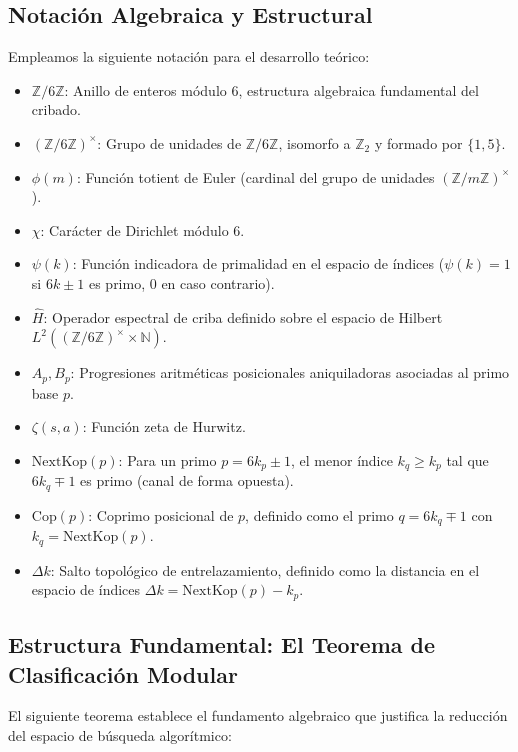 \documentclass{article}
\numberwithin{equation}{section}
\newcommand{\ZZ}{\mathbb{Z}}
\newcommand{\NN}{\mathbb{N}}
\theoremstyle{plain}
\theoremstyle{definition}
\begin{document}
\subsection{Notación Algebraica y Estructural}

Empleamos la siguiente notación para el desarrollo teórico:
\begin{itemize}
    \item $\ZZ/6\ZZ$: Anillo de enteros módulo 6, estructura algebraica fundamental del cribado.
    \item $(\ZZ/6\ZZ)^\times$: Grupo de unidades de $\ZZ/6\ZZ$, isomorfo a $\ZZ_2$ y formado por $\{1, 5\}$.
    \item $\phi(m)$: Función totient de Euler (cardinal del grupo de unidades $(\ZZ/m\ZZ)^\times$).
    \item $\chi$: Carácter de Dirichlet módulo 6.
    \item $\psi(k)$: Función indicadora de primalidad en el espacio de índices ($\psi(k) = 1$ si $6k\pm1$ es primo, $0$ en caso contrario).
    \item $\hat{H}$: Operador espectral de criba definido sobre el espacio de Hilbert $L^2((\ZZ/6\ZZ)^\times \times \NN)$.
    \item $A_p, B_p$: Progresiones aritméticas posicionales aniquiladoras asociadas al primo base $p$.
    \item $\zeta(s, a)$: Función zeta de Hurwitz.
    \item $\mathrm{NextKop}(p)$: Para un primo $p = 6k_p \pm 1$, el menor índice $k_q \ge k_p$ tal que $6k_q \mp 1$ es primo (canal de forma opuesta).
    \item $\mathrm{Cop}(p)$: Coprimo posicional de $p$, definido como el primo $q = 6k_q \mp 1$ con $k_q = \mathrm{NextKop}(p)$.
    \item $\Delta k$: Salto topológico de entrelazamiento, definido como la distancia en el espacio de índices $\Delta k = \mathrm{NextKop}(p) - k_p$.
\end{itemize}

\subsection{Estructura Fundamental: El Teorema de Clasificación Modular}

El siguiente teorema establece el fundamento algebraico que justifica la reducción del espacio de búsqueda algorítmico:
\end{document}
